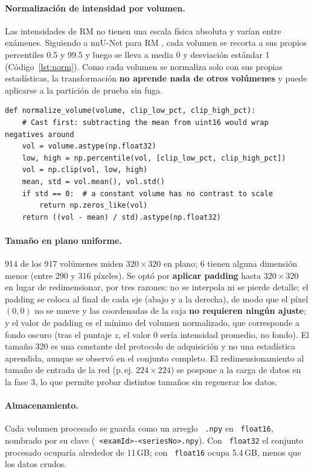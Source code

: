 \documentclass[12pt,letterpaper]{article}
\newcommand{\code}[1]{\texttt{\hyphenchar\font=-1 #1}}
\begin{document}
\paragraph{Normalización de intensidad por volumen.} Las intensidades de RM no tienen una escala física absoluta y varían entre exámenes. Siguiendo a nnU-Net para RM \cite{isensee2021nnunet}, cada volumen se recorta a sus propios percentiles 0.5 y 99.5 y luego se lleva a media 0 y desviación estándar 1 (Código~\ref{lst:norm}). Como cada volumen se normaliza solo con sus propias estadísticas, la transformación \textbf{no aprende nada de otros volúmenes} y puede aplicarse a la partición de prueba sin fuga.

\begin{lstlisting}[caption={Normalización por volumen (\code{src/data/transforms.py}).}, label={lst:norm}]
def normalize_volume(volume, clip_low_pct, clip_high_pct):
    # Cast first: subtracting the mean from uint16 would wrap negatives around
    vol = volume.astype(np.float32)
    low, high = np.percentile(vol, [clip_low_pct, clip_high_pct])
    vol = np.clip(vol, low, high)
    mean, std = vol.mean(), vol.std()
    if std == 0:  # a constant volume has no contrast to scale
        return np.zeros_like(vol)
    return ((vol - mean) / std).astype(np.float32)
\end{lstlisting}

\paragraph{Tamaño en plano uniforme.} 914 de los 917 volúmenes miden $320\times320$ en plano; 6 tienen alguna dimensión menor (entre 290 y 316 píxeles). Se optó por \textbf{aplicar padding} hasta $320\times320$ en lugar de redimensionar, por tres razones: no se interpola ni se pierde detalle; el padding se coloca al final de cada eje (abajo y a la derecha), de modo que el píxel $(0,0)$ no se mueve y las coordenadas de la caja \textbf{no requieren ningún ajuste}; y el valor de padding es el mínimo del volumen normalizado, que corresponde a fondo oscuro (tras el puntaje $z$, el valor 0 sería intensidad promedio, no fondo). El tamaño 320 es una constante del protocolo de adquisición y no una estadística aprendida, aunque se observó en el conjunto completo. El redimensionamiento al tamaño de entrada de la red (p.\,ej. $224\times224$) se pospone a la carga de datos en la fase 3, lo que permite probar distintos tamaños sin regenerar los datos.

\paragraph{Almacenamiento.} Cada volumen procesado se guarda como un arreglo \code{.npy} en \code{float16}, nombrado por su clave (\code{<examId>-<seriesNo>.npy}). Con \code{float32} el conjunto procesado ocuparía alrededor de 11\,GB; con \code{float16} ocupa 5.4\,GB, menos que los datos crudos.
\end{document}
